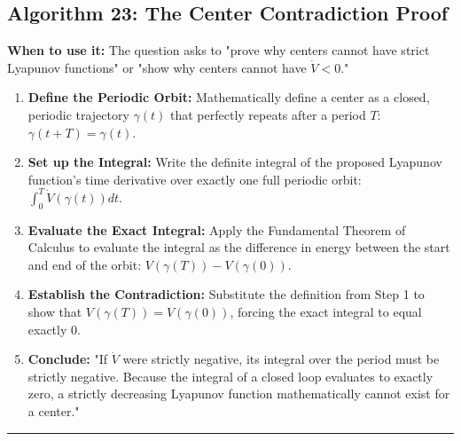 \documentclass[11pt, a4paper]{report}
\begin{document}
\subsection*{Algorithm 23: The Center Contradiction Proof}
\textbf{When to use it:} The question asks to "prove why centers cannot have strict Lyapunov functions" or "show why centers cannot have $\dot{V} < 0$."
\begin{enumerate}[label=\textbf{\arabic*.}]
    \item \textbf{Define the Periodic Orbit:} Mathematically define a center as a closed, periodic trajectory $\gamma(t)$ that perfectly repeats after a period $T$: $\gamma(t+T) = \gamma(t)$.
    \item \textbf{Set up the Integral:} Write the definite integral of the proposed Lyapunov function's time derivative over exactly one full periodic orbit: $\int_0^T \dot{V}(\gamma(t)) dt$.
    \item \textbf{Evaluate the Exact Integral:} Apply the Fundamental Theorem of Calculus to evaluate the integral as the difference in energy between the start and end of the orbit: $V(\gamma(T)) - V(\gamma(0))$.
    \item \textbf{Establish the Contradiction:} Substitute the definition from Step 1 to show that $V(\gamma(T)) = V(\gamma(0))$, forcing the exact integral to equal exactly $0$.
    \item \textbf{Conclude:} "If $\dot{V}$ were strictly negative, its integral over the period must be strictly negative. Because the integral of a closed loop evaluates to exactly zero, a strictly decreasing Lyapunov function mathematically cannot exist for a center."
\end{enumerate}
\vspace{1em}
\noindent\rule{\textwidth}{0.4pt}
\vspace{1em}
\end{document}

